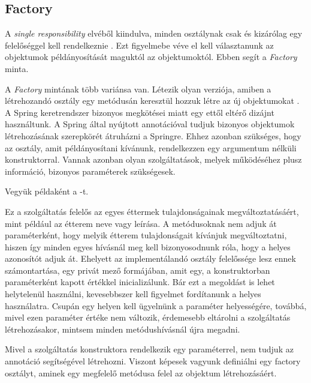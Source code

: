 \subsection{Factory}

A \emph{single responsibility} elvéből kiindulva, minden osztálynak csak és kizárólag egy felelőséggel kell rendelkeznie \cite{martin2003agile}. Ezt figyelmebe véve el kell választanunk az objektumok példányosítását maguktól az objektumoktól. Ebben segít a \emph{Factory} minta. \par

A \emph{Factory} mintának több variánsa van. Létezik olyan verziója, amiben a létrehozandó osztály egy metódusán keresztül hozzuk létre az új objektumokat \cite{gamma1995elements}. A Spring keretrendszer bizonyos megkötései miatt egy ettől eltérő dizájnt használtunk. A Spring által nyújtott  annotációval tudjuk bizonyos objektumok létrehozásának szerepkörét átruházni a Springre. Ehhez azonban szükséges, hogy az osztály, amit példányosítani kívánunk, rendelkezzen egy argumentum nélküli konstruktorral. Vannak azonban olyan szolgáltatások, melyek működéséhez plusz információ, bizonyos paraméterek szükségesek. \par

Vegyük példaként a -t.


Ez a szolgáltatás felelős az egyes éttermek tulajdonságainak megváltoztatásáért, mint például az étterem neve vagy leírása. A metódusoknak nem adjuk át paraméterként, hogy melyik étterem tulajdonságait kívánjuk megváltoztatni, hiszen így minden egyes hívásnál meg kell bizonyosodnunk róla, hogy a helyes azonosítót adjuk át. Ehelyett az implementálandó osztály felelőssége lesz ennek számontartása, egy privát mező formájában, amit egy, a konstruktorban paraméterként kapott értékkel inicializálunk. Bár ezt a megoldást is lehet helytelenül használni, kevesebbszer kell figyelmet fordítanunk a helyes használatra. Csupán egy helyen kell ügyelnünk a paraméter helyességére, továbbá, mivel ezen paraméter értéke nem változik, érdemesebb eltárolni a szolgáltatás létrehozásakor, mintsem minden metódushívásnál újra megadni. \par

Mivel a szolgáltatás konstruktora rendelkezik egy paraméterrel, nem tudjuk az  annotáció segítségével létrehozni. Viszont képesek vagyunk definiálni egy factory osztályt, aminek egy megfelelő metódusa felel az objektum létrehozásáért. \par

